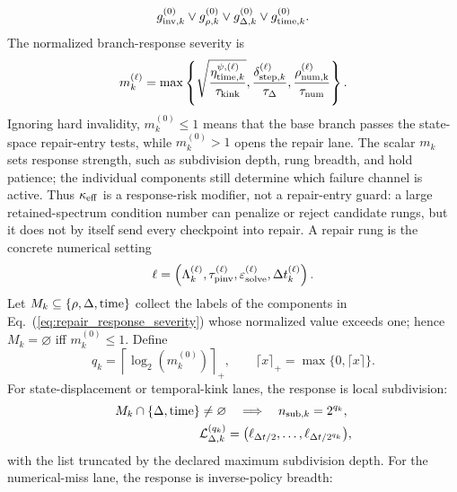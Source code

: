 \documentclass[
  reprint,
  amsmath,
  amssymb,
  aps,
  pra,
  nofootinbib,
  superscriptaddress,
  floatfix
]{revtex4-2}
\newcommand{\eps}{\varepsilon}
\begin{document}
\begin{equation}
\begin{gathered}
g_{{\rm inv},k}^{(0)}\vee g_{\rho,k}^{(0)}
\vee g_{\Delta,k}^{(0)}\vee g_{{\rm time},k}^{(0)} .
\end{gathered}
\label{eq:solve_repair_condition}
\end{equation}
The normalized branch-response severity is
\begin{equation}
m_k^{(\ell)}
=
\max\left\{
\sqrt{\frac{\eta_{{\rm time},k}^{\psi,(\ell)}}{\tau_{\rm kink}}},
\frac{\delta_{{\rm step},k}^{(\ell)}}{\tau_\Delta},
\frac{\rho_{\rm num,k}^{(\ell)}}{\tau_{\rm num}}
\right\}.
\label{eq:repair_response_severity}
\end{equation}
Ignoring hard invalidity, $m_k^{(0)}\le 1$ means that the base branch passes the state-space repair-entry tests, while $m_k^{(0)}>1$ opens the repair lane.  The scalar $m_k$ sets response strength, such as subdivision depth, rung breadth, and hold patience; the individual components still determine which failure channel is active.  Thus $\kappa_{\rm eff}$ is a response-risk modifier, not a repair-entry guard: a large retained-spectrum condition number can penalize or reject candidate rungs, but it does not by itself send every checkpoint into repair.  A repair rung is the concrete numerical setting
\[
\ell
=
\left(
\Lambda_k^{(\ell)},\tau_{\rm pinv}^{(\ell)},
\eps_{\rm solve}^{(\ell)},\Delta t_k^{(\ell)}
\right).
\]
Let $M_k\subseteq\{\rho,\Delta,{\rm time}\}$ collect the labels of the components in Eq.~(\ref{eq:repair_response_severity}) whose normalized value exceeds one; hence $M_k=\varnothing$ iff $m_k^{(0)}\le 1$.  Define
\begin{equation}
q_k=\left\lceil\log_2(m_k^{(0)})\right\rceil_+,
\qquad
\lceil x\rceil_+=\max\{0,\lceil x\rceil\}.
\label{eq:repair_response_breadth}
\end{equation}
For state-displacement or temporal-kink lanes, the response is local subdivision:
\begin{equation}
\begin{aligned}
M_k\cap\{\Delta,{\rm time}\}\ne\varnothing
&\quad\Longrightarrow\quad
n_{{\rm sub},k}=2^{q_k},
\\
\mathcal L_{\Delta,k}^{(q_k)}
&=
\bigl(
\ell_{\Delta t/2},\ldots,\ell_{\Delta t/2^{q_k}}
\bigr),
\end{aligned}
\label{eq:subdivision_response_schedule}
\end{equation}
with the list truncated by the declared maximum subdivision depth.  For the numerical-miss lane, the response is inverse-policy breadth:
\end{document}
